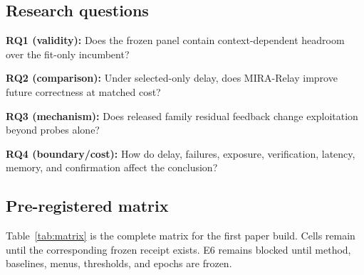 \documentclass[sigconf,anonymous]{aamas}
\newcommand{\tbd}{\text{TBD}}
\begin{document}
\subsection{Research questions}
\textbf{RQ1 (validity):} Does the frozen panel contain context-dependent headroom over the fit-only incumbent?\par
\textbf{RQ2 (comparison):} Under selected-only delay, does MIRA-Relay improve future correctness at matched cost?\par
\textbf{RQ3 (mechanism):} Does released family residual feedback change exploitation beyond probes alone?\par
\textbf{RQ4 (boundary/cost):} How do delay, failures, exposure, verification, latency, memory, and confirmation affect the conclusion?

\subsection{Pre-registered matrix}
Table~\ref{tab:matrix} is the complete matrix for the first paper build. Cells remain \tbd{} until the corresponding frozen receipt exists. E6 remains blocked until method, baselines, menus, thresholds, and epochs are frozen.
\end{document}
